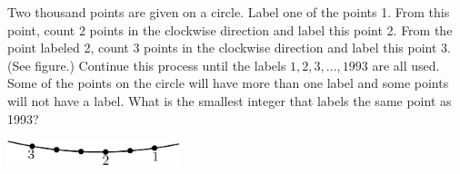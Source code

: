 Two thousand points are given on a circle.  Label one of the points 1.  From this point, count 2 points in the clockwise direction and label this point 2.  From the point labeled 2, count 3 points in the clockwise direction and label this point 3.  (See figure.)  Continue this process until the labels $1, 2, 3, \dots, 1993$ are all used.  Some of the points on the circle will have more than one label and some points will not have a label.  What is the smallest integer that labels the same point as 1993?

\begin{center}
\includegraphics[width = 50.400000000000006mm]{img/fig0.png}
\end{center}